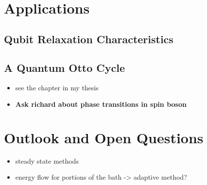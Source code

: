 \documentclass[reprint,aps,superscriptaddress]{revtex4-2}
\begin{document}
\section{Applications}
\label{sec:applications}

\subsection{Qubit Relaxation Characteristics}
\label{sec:qubit-relax-char}

\subsection{A Quantum Otto Cycle}
\label{sec:quantum-otto-cycle}



\begin{itemize}
\item see the chapter in my thesis
\item \textbf{Ask richard about phase transitions in spin boson}
\end{itemize}


\section{Outlook and Open Questions}
\label{sec:outl-open-quest}
\begin{itemize}
\item steady state methods
\item energy flow for portions of the bath -> adaptive method?
\end{itemize}


\end{document}
